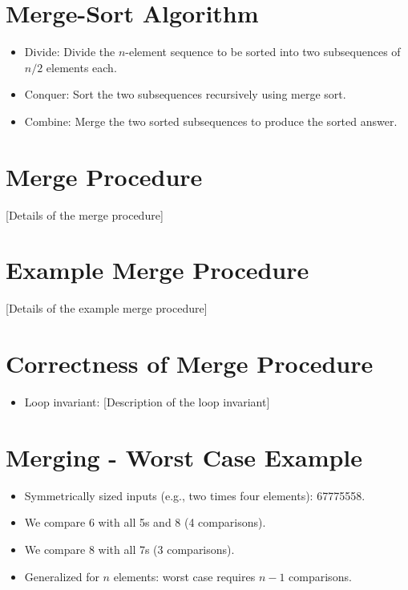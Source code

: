 \documentclass[12pt,openany]{book}
\theoremstyle{definition}
\begin{document}
	\section{Merge-Sort Algorithm}
	\begin{itemize}
		\item Divide: Divide the \( n \)-element sequence to be sorted into two subsequences of \( n/2 \) elements each.
		\item Conquer: Sort the two subsequences recursively using merge sort.
		\item Combine: Merge the two sorted subsequences to produce the sorted answer.
	\end{itemize}
	
	\section{Merge Procedure}
	[Details of the merge procedure]
	
	\section{Example Merge Procedure}
	[Details of the example merge procedure]
	
	\section{Correctness of Merge Procedure}
	\begin{itemize}
		\item Loop invariant: [Description of the loop invariant]
	\end{itemize}
	
	\section{Merging - Worst Case Example}
	\begin{itemize}
		\item Symmetrically sized inputs (e.g., two times four elements): 67775558.
		\item We compare 6 with all 5s and 8 (4 comparisons).
		\item We compare 8 with all 7s (3 comparisons).
		\item Generalized for \( n \) elements: worst case requires \( n - 1 \) comparisons.
	\end{itemize}
	
\end{document}
